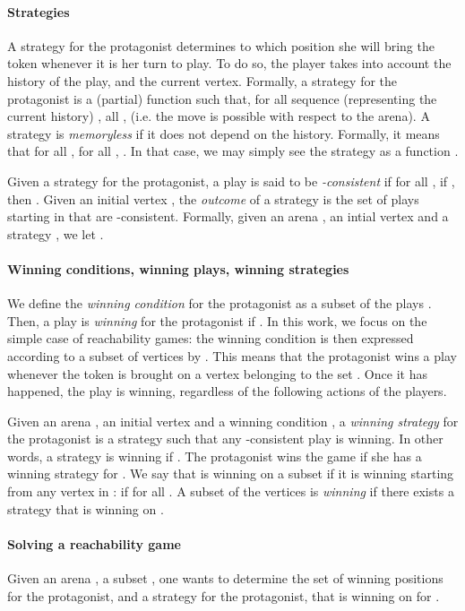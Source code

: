 \documentclass[envcountsame]{llncs} \usepackage[english]{babel}
\begin{document}
\paragraph{Strategies}A strategy for the protagonist determines
to which position she will bring the token whenever it is her turn to play.
To do so, the player takes into account the history of the play, and the current
vertex.
Formally, a strategy for the protagonist is a (partial) function
 such that, for all sequence (representing the
current history) , all ,  (i.e. the move is possible with respect to the arena). 
A strategy  is \emph{memoryless} if it does not depend on the history. Formally, it means
that for all
, for all , . In that case,
we may simply see the strategy as a function .

Given a strategy  for the protagonist, a play 
 is said to be \emph{-consistent} if for all , if , then . Given an initial
vertex , the \emph{outcome} of a strategy  is the set of plays starting in 
that are -consistent. Formally, given an arena , an intial vertex  and 
a strategy , we let \sigma.

\paragraph{Winning conditions, winning plays, winning strategies}
 We define the \emph{winning condition} for the protagonist as a subset of the plays .
 Then, a play  is \emph{winning} for the protagonist if . In this work, we focus on the simple
 case of reachability games: the winning condition is then expressed according to a subset of vertices 
 by . This means that the protagonist
 wins a play whenever the token is brought on a vertex belonging to the set . Once it has happened, the play
 is winning, regardless of the following actions of the players.


Given an arena , an initial vertex  and a
winning condition , a
\emph{winning strategy}  for the protagonist is a strategy such that
any -consistent play is winning. In other words, a strategy  is winning if
. The protagonist wins the game 
if she has a winning strategy for .
We say that  is winning on a subset  if it is winning
starting from any vertex in :
if  for all .  A subset
 of the vertices is \emph{winning} if there exists
a strategy  that is winning on .

\paragraph{Solving a reachability game} Given an arena ,
a subset , one wants to determine the set 
of winning positions for the protagonist, and a strategy 
for the protagonist, that is winning on  for .
\end{document}
